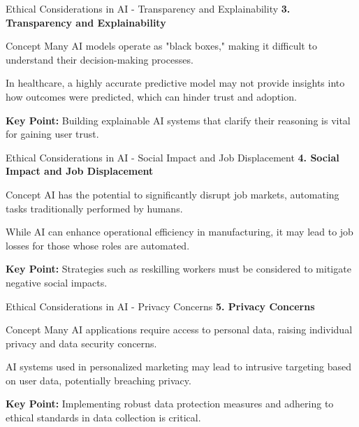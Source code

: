 \documentclass[aspectratio=169]{beamer}
\begin{document}
\begin{frame}[fragile]{Ethical Considerations in AI - Transparency and Explainability}
    \textbf{3. Transparency and Explainability}
    \begin{block}{Concept}
        Many AI models operate as "black boxes," making it difficult to understand their decision-making processes.
    \end{block}
    \begin{example}
        In healthcare, a highly accurate predictive model may not provide insights into how outcomes were predicted, which can hinder trust and adoption.
    \end{example}
    \textbf{Key Point:} Building explainable AI systems that clarify their reasoning is vital for gaining user trust.
\end{frame}

\begin{frame}[fragile]{Ethical Considerations in AI - Social Impact and Job Displacement}
    \textbf{4. Social Impact and Job Displacement}
    \begin{block}{Concept}
        AI has the potential to significantly disrupt job markets, automating tasks traditionally performed by humans.
    \end{block}
    \begin{example}
        While AI can enhance operational efficiency in manufacturing, it may lead to job losses for those whose roles are automated.
    \end{example}
    \textbf{Key Point:} Strategies such as reskilling workers must be considered to mitigate negative social impacts.
\end{frame}

\begin{frame}[fragile]{Ethical Considerations in AI - Privacy Concerns}
    \textbf{5. Privacy Concerns}
    \begin{block}{Concept}
        Many AI applications require access to personal data, raising individual privacy and data security concerns.
    \end{block}
    \begin{example}
        AI systems used in personalized marketing may lead to intrusive targeting based on user data, potentially breaching privacy.
    \end{example}
    \textbf{Key Point:} Implementing robust data protection measures and adhering to ethical standards in data collection is critical.
\end{frame}
\end{document}
